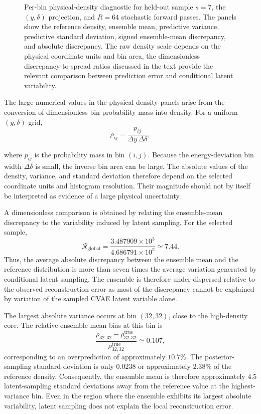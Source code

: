 \begin{figure}[h!]
\centering
{}
\caption{ Per-bin physical-density diagnostic for held-out sample \(s=7\), the \((y,\delta)\) projection, and \(R=64\) stochastic forward passes. The panels show the reference density, ensemble mean, predictive variance, predictive standard deviation, signed ensemble-mean discrepancy, and absolute discrepancy. The raw density scale depends on the physical coordinate units and bin area, the dimensionless
discrepancy-to-spread ratios discussed in the text provide the relevant comparison between prediction error and conditional latent variability.}
\label{fig:global_uq_per_bin_density}
\end{figure}

The large numerical values in the physical-density panels arise from the conversion of dimensionless bin probability mass into density. For a uniform \((y,\delta)\) grid,
\begin{equation}
     \rho_{ij}
    =
    \frac{
        p_{ij}
    }{
        \Delta y\,\Delta\delta
    },
\end{equation}
   
where \(p_{ij}\) is the probability mass in bin \((i,j)\). Because the energy-deviation bin width \(\Delta\delta\) is small, the inverse bin area can be large. The absolute values of the density, variance, and standard deviation therefore depend on the selected coordinate units and histogram resolution. Their magnitude should not by itself be
interpreted as evidence of a large physical uncertainty.

A dimensionless comparison is obtained by relating the
ensemble-mean discrepancy to the variability induced by latent
sampling. For the selected sample,
\[
    \mathcal{R}_{\mathrm{global}}
    =
    \frac{
        3.487909\times10^{3}
    }{
        4.686791\times10^{2}
    }
    \simeq 7.44.
\]
Thus, the average absolute discrepancy between the ensemble mean and the reference distribution is more than seven times the average variation generated by conditional latent sampling. The ensemble is therefore under-dispersed relative to the observed reconstruction error as most of the discrepancy cannot be explained by variation of the sampled CVAE latent variable alone.

The largest absolute variance occurs at bin \((32,32)\), close to the high-density core. The relative ensemble-mean bias at this bin is
\[
    \frac{
        \overline{\rho}_{32,32}
        -
        \rho_{32,32}^{\mathrm{true}}
    }{
        \rho_{32,32}^{\mathrm{true}}
    }
    \simeq 0.107,
\]
corresponding to an overprediction of approximately \(10.7\%\). The posterior-sampling standard deviation is only $0.0238$ or approximately \(2.38\%\) of the reference density. Consequently, the ensemble mean is therefore approximately \(4.5\) latent-sampling standard deviations away from the reference value at the highest-variance bin. Even in the region where the ensemble exhibits its largest absolute variability, latent sampling does not explain the local reconstruction error.

